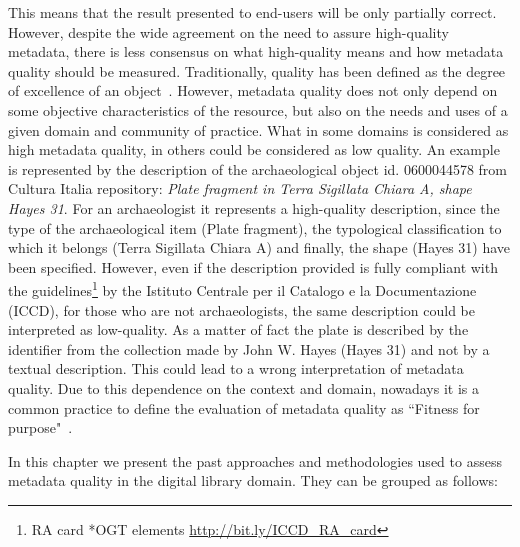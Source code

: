 \documentclass[epsfig,a4paper,12pt,titlepage]{book}
\begin{document}
This means that the result presented to  end-users will be only partially correct. 
However, despite the wide agreement on the need to assure high-quality metadata, there is less consensus on what high-quality means and how metadata quality should be measured. Traditionally, quality has been defined as the degree of excellence of an object~\cite{graham1990quality}. However, metadata quality does not only depend on some objective characteristics of the resource, but also on the needs and uses of a given domain and community of practice. What in some domains is considered as high metadata quality, in others could be considered as low  quality. An example is represented by the description of the archaeological object id. 0600044578 from Cultura Italia repository: \textit{Plate fragment in Terra Sigillata Chiara A, shape Hayes 31}. For an archaeologist it represents a high-quality description,  since the type of the archaeological item (Plate fragment), the typological classification to which it belongs (Terra Sigillata Chiara A) and finally, the shape (Hayes 31) have been specified. However, even if the description provided is fully compliant with the guidelines\footnote{RA card *OGT elements {\url{http://bit.ly/ICCD_RA_card}}} by the Istituto Centrale per il Catalogo e la Documentazione (ICCD), for those who are not archaeologists, the same description could be interpreted as low-quality. As a matter of fact the plate is described by the identifier from the collection made by John W. Hayes (Hayes 31) and not by a textual description. This could lead to a wrong interpretation of metadata quality.
Due to this dependence on the context and domain, nowadays it is a common practice to define the evaluation of metadata quality as ``Fitness for purpose"~\cite{10.1016/j.websem.2008.02.005}.

In this chapter we present the past approaches and methodologies used to assess metadata quality in the digital library domain.  
They can be grouped as follows:
\end{document}

